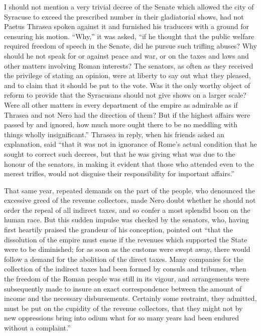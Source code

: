 I should not mention a very trivial decree of the Senate which allowed the city of Syracuse to exceed the prescribed number in their gladiatorial shows, had not Paetus Thrasea spoken against it and furnished his traducers with a ground for censuring his motion. ``Why,'' it was asked, ``if he thought that the public welfare required freedom of speech in the Senate, did he pursue such trifling abuses? Why should he not speak for or against peace and war, or on the taxes and laws and other matters involving Roman interests? The senators, as often as they received the privilege of stating an opinion, were at liberty to say out what they pleased, and to claim that it should be put to the vote. Was it the only worthy object of reform to provide that the Syracusans should not give shows on a larger scale? Were all other matters in every department of the empire as admirable as if Thrasea and not Nero had the direction of them? But if the highest affairs were passed by and ignored, how much more ought there to be no meddling with things wholly insignificant.'' Thrasea in reply, when his friends asked an explanation, said ``that it was not in ignorance of Rome's actual condition that he sought to correct such decrees, but that he was giving what was due to the honour of the senators, in making it evident that those who attended even to the merest trifles, would not disguise their responsibility for important affairs.''


That same year, repeated demands on the part of the people, who denounced the excessive greed of the revenue collectors, made Nero doubt whether he should not order the repeal of all indirect taxes, and so confer a most splendid boon on the human race. But this sudden impulse was checked by the senators, who, having first heartily praised the grandeur of his conception, pointed out ``that the dissolution of the empire must ensue if the revenues which supported the State were to be diminished; for as soon as the customs were swept away, there would follow a demand for the abolition of the direct taxes. Many companies for the collection of the indirect taxes had been formed by consuls and tribunes, when the freedom of the Roman people was still in its vigour, and arrangements were subsequently made to insure an exact correspondence between the amount of income and the necessary disbursements. Certainly some restraint, they admitted, must be put on the cupidity of the revenue collectors, that they might not by new oppressions bring into odium what for so many years had been endured without a complaint.''

